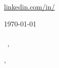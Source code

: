 \documentclass[12pt]{letter}
\begin{document}
\AddToShipoutPictureBG{%
\color{gr}
\AtPageUpperLeft{\rule[-1.3in]{\paperwidth}{1.3in}}
}

\begin{center}
{\fontsize{28}{0}\selectfont\scshape \myname}

\href{mailto:\myemail}{\faEnvelope\enspace \myemail}\hfill
\href{https://linkedin.com/in/\mylinkedin}{\faLinkedinIn\enspace linkedin.com/in/\mylinkedin}\hfill
\href{tel:\myphone}{\faPhone\enspace \myphone}\hfill
\enspace \mylocation
\end{center}

\vspace{0.2in}

\today\\

\vspace{0.1in}\\

\vspace{-0.1in}\greeting\ \recipient,\\

\vspace{-0.1in}\setlength\parindent{24pt}
\noindent

\vspace{0.1in}
\vfill

\begin{flushright}
\closer,

\myname\\
\mytitle
\end{flushright}
\end{document}
